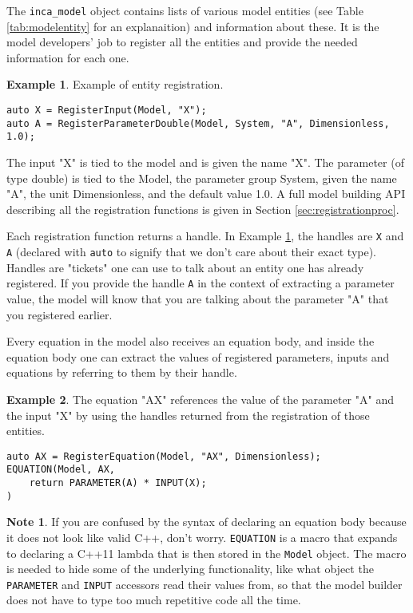 \documentclass[11pt]{article}
\theoremstyle{definition}
\newtheorem{mynote}{Note}
\newenvironment{note}%
  {\begin{lrbox}{\notebox}%
   \begin{minipage}{\dimexpr\linewidth-2\fboxsep}
   \begin{mynote}}%
  {\end{mynote}%
   \end{minipage}%
   \end{lrbox}%
   \begin{trivlist}
     \item[]\colorbox{silver}{\usebox\notebox}
   \end{trivlist}}
\newtheorem{myexample}{Example}
\newenvironment{example}%
  {\begin{lrbox}{\examplebox}%
   \begin{minipage}{\dimexpr\linewidth-2\fboxsep}
   \begin{myexample}}%
  {\end{myexample}%
   \end{minipage}%
   \end{lrbox}%
   \begin{trivlist}
     \item[]\colorbox{silver}{\usebox\examplebox}
   \end{trivlist}}
\begin{document}
The {\tt inca\_model} object contains lists of various model entities (see Table \ref{tab:modelentity} for an explanaition) and information about these. It is the model developers' job to register all the entities and provide the needed information for each one.

\begin{example}\label{ex:registration}
Example of entity registration.
\begin{lstlisting}[style=mycpp]
auto X = RegisterInput(Model, "X");
auto A = RegisterParameterDouble(Model, System, "A", Dimensionless, 1.0);
\end{lstlisting}
The input "X" is tied to the model and is given the name "X". The parameter (of type double) is tied to the Model, the parameter group System, given the name "A", the unit Dimensionless, and the default value 1.0. A full model building API describing all the registration functions is given in Section \ref{sec:registrationproc}.
\end{example}

Each registration function returns a handle. In Example \ref{ex:registration}, the handles are {\tt X} and {\tt A} (declared with {\tt auto} to signify that we don't care about their exact type). Handles are "tickets" one can use to talk about an entity one has already registered. If you provide the handle {\tt A} in the context of extracting a parameter value, the model will know that you are talking about the parameter "A" that you registered earlier.

Every equation in the model also receives an equation body, and inside the equation body one can extract the values of registered parameters, inputs and equations by referring to them by their handle.

\begin{example}\label{ex:equation}
The equation "AX" references the value of the parameter "A" and the input "X" by using the handles returned from the registration of those entities.
\begin{lstlisting}[style=mycpp]
auto AX = RegisterEquation(Model, "AX", Dimensionless);
EQUATION(Model, AX,
	return PARAMETER(A) * INPUT(X);
)
\end{lstlisting}
\end{example}

\begin{note}
If you are confused by the syntax of declaring an equation body because it does not look like valid C++, don't worry. {\tt EQUATION} is a macro that expands to declaring a C++11 lambda that is then stored in the {\tt Model} object. The macro is needed to hide some of the underlying functionality, like what object the {\tt PARAMETER} and {\tt INPUT} accessors read their values from, so that the model builder does not have to type too much repetitive code all the time.
\end{note}
\end{document}
